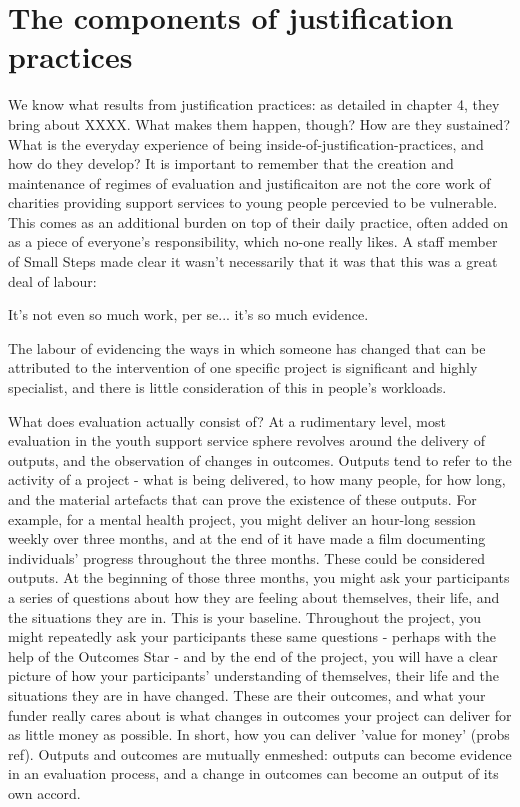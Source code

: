 \section{The components of justification practices}
We know what results from justification practices: as detailed in chapter 4, they bring about XXXX. What makes them happen, though? How are they sustained? What is the everyday experience of being inside-of-justification-practices, and how do they develop?
It is important to remember that the creation and maintenance of regimes of evaluation and justificaiton are not the core work of charities providing support services to young people percevied to be vulnerable. This comes as an additional burden on top of their daily practice, often added on as a piece of everyone's responsibility, which no-one really likes. A staff member of Small Steps made clear it wasn't necessarily that it was that this was a great deal of labour:

It's not even so much work, per se... it's so much evidence.

The labour of evidencing the ways in which someone has changed that can be attributed to the intervention of one specific project is significant and highly specialist, and there is little consideration of this in people's workloads.

What does evaluation actually consist of? At a rudimentary level, most evaluation in the youth support service sphere revolves around the delivery of outputs, and the observation of changes in outcomes. Outputs tend to refer to the activity of a project - what is being delivered, to how many people, for how long, and the material artefacts that can prove the existence of these outputs. For example, for a mental health project, you might deliver an hour-long session weekly over three months, and at the end of it have made a film documenting individuals' progress throughout the three months. These could be considered outputs. At the beginning of those three months, you might ask your participants a series of questions about how they are feeling about themselves, their life, and the situations they are in. This is your baseline. Throughout the project, you might repeatedly ask your participants these same questions - perhaps with the help of the Outcomes Star - and by the end of the project, you will have a clear picture of how your participants' understanding of themselves, their life and the situations they are in have changed. These are their outcomes, and what your funder really cares about is what changes in outcomes your project can deliver for as little money as possible. In short, how you can deliver 'value for money' (probs ref). Outputs and outcomes are mutually enmeshed: outputs can become evidence in an evaluation process, and a change in outcomes can become an output of its own accord.

